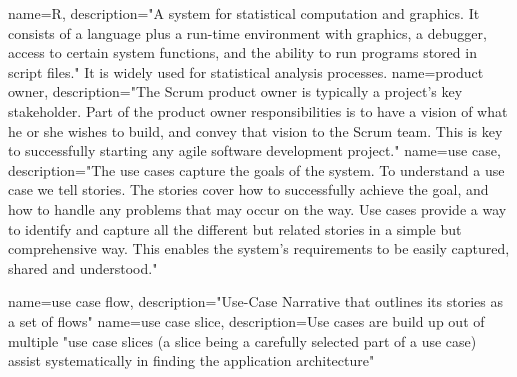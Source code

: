 {
  name={R},
  description={"A system for statistical computation and graphics. It consists of a language plus a run-time environment with graphics, a debugger, access to certain system functions, and the ability to run programs stored in script files." It is widely used for statistical analysis processes. \cite{R}}
}
{
  name={product owner},
  description={"The Scrum product owner is typically a project's key stakeholder. Part of the product owner responsibilities is to have a vision of what he or she wishes to build, and convey that vision to the Scrum team. This is key to successfully starting any agile software development project." \cite{product_owner}}
}
{
  name={use case},
  description={"The use cases capture the goals of the system. To understand a use case we tell stories. The stories cover how to successfully achieve the goal, and how to handle any problems that may occur on the way. Use cases provide a way to identify and capture all the different but related stories in a simple but comprehensive way. This enables the system’s requirements to be easily captured, shared and understood." \cite{jacobson2011usecase}}
  }

{
  name={use case flow},
  description={"Use-Case Narrative that outlines its stories as a set of flows" \cite{jacobson2011usecase}}
}
{
  name={use case slice},
  description={Use cases are build up out of multiple "use case slices (a slice being a carefully selected part of a use case) assist systematically in finding the application architecture" \cite{jacobson2011usecase}}
}



\printglossaries

\newpage
